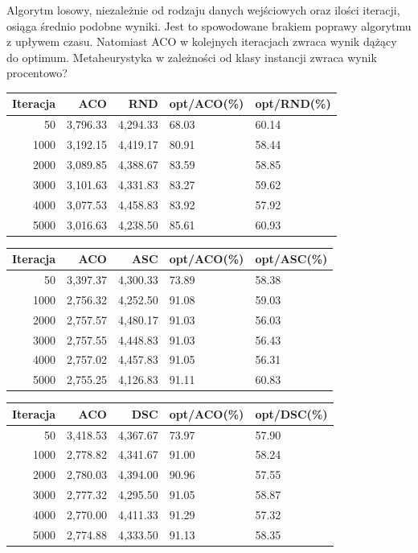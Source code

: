 \documentclass[10pt,a4paper]{article}
\begin{document}
Algorytm losowy, niezależnie od rodzaju danych wejściowych oraz ilości iteracji, osiąga średnio podobne wyniki. Jest to spowodowane brakiem poprawy algorytmu z upływem czasu. Natomiast ACO w kolejnych iteracjach zwraca wynik dążący do optimum.
Metaheurystyka w zależności od klasy instancji zwraca wynik procentowo?

\newpage
\begin{tabular}{rrrll}
\toprule
Iteracja & ACO & RND  & opt/ACO(\%) & opt/RND(\%) \\
\midrule
50	& 3,796.33	& 4,294.33	& 68.03	& 60.14 \\
1000	& 3,192.15	& 4,419.17	& 80.91	& 58.44 \\
2000	& 3,089.85	& 4,388.67	& 83.59	& 58.85 \\
3000	& 3,101.63	& 4,331.83	& 83.27	& 59.62 \\
4000	& 3,077.53	& 4,458.83	& 83.92	& 57.92 \\
5000	& 3,016.63	& 4,238.50	& 85.61	& 60.93 \\
\bottomrule
\end{tabular}

\begin{tabular}{rrrll}
Iteracja & ACO & ASC  & opt/ACO(\%) & opt/ASC(\%) \\
\midrule

50	& 3,397.37	& 4,300.33	& 73.89 &	58.38\\
1000	& 2,756.32	& 4,252.50 &	91.08 &	59.03\\
2000	& 2,757.57	& 4,480.17	& 91.03 & 56.03\\
3000	& 2,757.55	& 4,448.83	& 91.03 &	56.43\\
4000	& 2,757.02	& 4,457.83	& 91.05 &	56.31\\
5000	& 2,755.25	& 4,126.83	& 91.11 &	60.83\\
\bottomrule
\end{tabular}

\begin{tabular}{rrrll}
Iteracja & ACO & DSC  & opt/ACO(\%) & opt/DSC(\%) \\
\midrule
50	& 3,418.53	& 4,367.67	& 73.97 &	57.90\\
1000	& 2,778.82	& 4,341.67	& 91.00 &	58.24\\
2000	& 2,780.03	& 4,394.00	& 90.96 & 57.55\\
3000	& 2,777.32	& 4,295.50	& 91.05 &	58.87\\
4000	& 2,770.00	& 4,411.33	& 91.29 &	57.32\\
5000	& 2,774.88	& 4,333.50	& 91.13 &	58.35\\

\bottomrule
\end{tabular}
\end{document}

